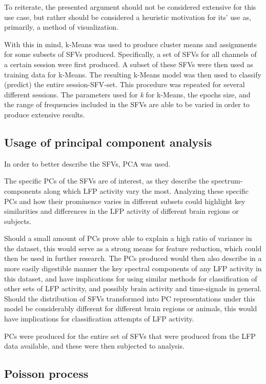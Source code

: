 \documentclass{article}
\begin{document}
To reiterate, the presented argument should not be considered extensive for this use case, but rather should be considered a heuristic motivation for its' use as, primarily, a method of visualization.

With this in mind, k-Means was used to produce cluster means and assignments for some subsets of SFVs produced.
Specifically, a set of SFVs for all channels of a certain session were first produced.
A subset of these SFVs were then used as training data for k-Means.
The resulting k-Means model was then used to classify (predict) the entire session-SFV-set.
This procedure was repeated for several different sessions.
The parameters used for \textit{k} for k-Means, the epochs size, and the range of frequencies included in the SFVs are able to be varied in order to produce extensive results. 

\subsection{Usage of principal component analysis}\label{PCA Methods}

In order to better describe the SFVs, PCA was used.

The specific PCs of the SFVs are of interest, as they describe the spectrum-components along which LFP activity vary the most.
Analyzing these specific PCs and how their prominence varies in different subsets could highlight key similarities and differences in the LFP activity of different brain regions or subjects.

Should a small amount of PCs prove able to explain a high ratio of variance in the dataset, this would serve as a strong means for feature reduction, which could then be used in further research.
The PCs produced would then also describe in a more easily digestible manner the key spectral components of any LFP activity in this dataset, and have implications for using similar methods for classification of other sets of LFP activity, and possibly brain activity and time-signals in general.
Should the distribution of SFVs transformed into PC representations under this model be considerably different for different brain regions or animals, this would have implications for classification attempts of LFP activity.

PCs were produced for the entire set of SFVs that were produced from the LFP data available, and these were then subjected to analysis. 

\subsection{Poisson process}\label{Poiss Method}
\end{document}
